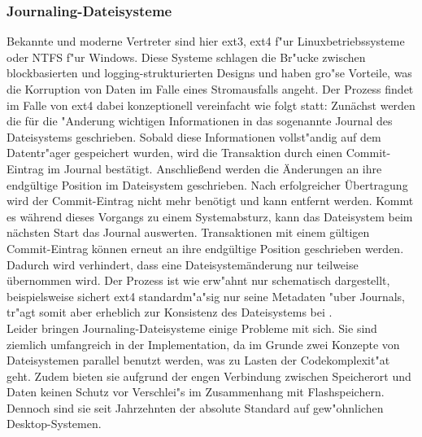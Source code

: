 \documentclass[11pt]{article}
\begin{document}
\subsubsection{Journaling-Dateisysteme}
Bekannte und moderne Vertreter sind hier ext3, ext4 f"ur Linuxbetriebssysteme oder
NTFS f"ur Windows. Diese Systeme schlagen die Br"ucke zwischen blockbasierten und logging-strukturierten Designs
und haben gro"se Vorteile, was die Korruption von Daten im Falle eines Stromausfalls angeht.
Der Prozess findet im Falle von ext4 dabei konzeptionell vereinfacht wie folgt statt:
Zunächst werden die für die "Anderung wichtigen Informationen in das sogenannte Journal des Dateisystems geschrieben.
Sobald diese Informationen vollst"andig auf dem Datentr"ager gespeichert wurden, 
wird die Transaktion durch einen Commit-Eintrag im Journal bestätigt.
Anschließend werden die Änderungen an ihre endgültige Position im Dateisystem geschrieben.
Nach erfolgreicher Übertragung wird der Commit-Eintrag nicht mehr benötigt und kann entfernt werden.
Kommt es während dieses Vorgangs zu einem Systemabsturz,
kann das Dateisystem beim nächsten Start das Journal auswerten. 
Transaktionen mit einem gültigen Commit-Eintrag können erneut an ihre endgültige Position geschrieben werden. 
Dadurch wird verhindert, dass eine Dateisystemänderung nur teilweise übernommen wird.
Der Prozess ist wie erw"ahnt nur schematisch dargestellt,
beispielsweise sichert ext4 standardm"a"sig nur seine Metadaten
"uber Journals, tr"agt somit aber erheblich zur Konsistenz des Dateisystems bei \cite{kernel1}. \\
Leider bringen Journaling-Dateisysteme einige Probleme mit sich.
Sie sind ziemlich umfangreich in der Implementation, da im Grunde zwei Konzepte von Dateisystemen parallel benutzt werden,
was zu Lasten der Codekomplexit"at geht.
Zudem bieten sie aufgrund der engen Verbindung zwischen Speicherort und Daten keinen Schutz vor Verschlei"s im
Zusammenhang mit Flashspeichern. Dennoch sind sie seit Jahrzehnten der absolute Standard auf gew"ohnlichen Desktop-Systemen.
\end{document}
